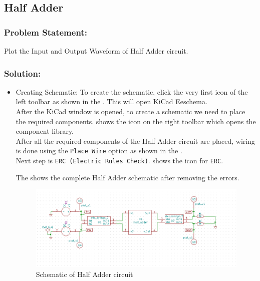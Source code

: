 \subsection{Half Adder}

\subsubsection{Problem Statement:}  Plot the Input and Output Waveform of Half Adder circuit.

\subsubsection{Solution:}

\begin{itemize}

\item Creating Schematic:  To create the schematic, click the very first icon of the left toolbar as shown in the . This will open KiCad Eeschema.\\
After the KiCad window is opened, to create a schematic we need to place the required components.  shows the icon on the right toolbar which opens the component library.\\
After all the required components of the Half Adder circuit are placed, wiring is done using the {\tt Place Wire} option as shown in the .\\
Next step is {\tt ERC (Electric Rules Check)}.  shows the icon for {\tt ERC}.

The  shows the complete Half Adder schematic after removing the errors.
\begin{figure}[!htp]
    \centering
    \includegraphics[width=\hgfig]{figures/ha_schematic.png}
    \caption{Schematic of Half Adder circuit}
    \label{ha_schematic}
\end{figure}


\end{itemize}
